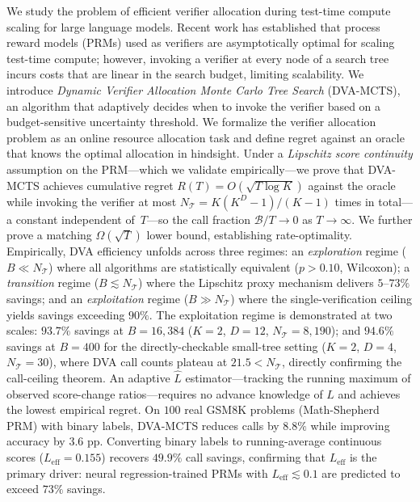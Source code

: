We study the problem of efficient verifier allocation during test-time compute scaling
for large language models. Recent work has established that process reward models (PRMs)
used as verifiers are asymptotically optimal for scaling test-time compute; however,
invoking a verifier at every node of a search tree incurs costs that are linear in the
search budget, limiting scalability. We introduce \emph{Dynamic Verifier Allocation
Monte Carlo Tree Search} (DVA-MCTS), an algorithm that adaptively decides when to
invoke the verifier based on a budget-sensitive uncertainty threshold. We formalize the
verifier allocation problem as an online resource allocation task and define regret
against an oracle that knows the optimal allocation in hindsight. Under a
\emph{Lipschitz score continuity} assumption on the PRM---which we validate
empirically---we prove that DVA-MCTS achieves cumulative regret
$R(T) = O\!\left(\sqrt{T \log K}\right)$ against the oracle while invoking the verifier
at most $N_{\mathcal{T}} = K(K^D-1)/(K-1)$ times in total---a constant independent of~$T$---so
the call fraction $\mathcal{B}/T \to 0$ as $T \to \infty$.
We further prove a matching $\Omega(\sqrt{T})$ lower bound, establishing rate-optimality.
Empirically, DVA efficiency unfolds across three regimes: an \emph{exploration}
regime ($B \ll N_{\mathcal{T}}$) where all algorithms are statistically equivalent
($p{>}0.10$, Wilcoxon); a \emph{transition} regime ($B \lesssim N_{\mathcal{T}}$)
where the Lipschitz proxy mechanism delivers $5$--$73\%$ savings; and an
\emph{exploitation} regime ($B \gg N_{\mathcal{T}}$) where the single-verification
ceiling yields savings exceeding $90\%$.
The exploitation regime is demonstrated at two scales:
$\mathbf{93.7\%}$ savings at $B{=}16{,}384$ ($K{=}2$, $D{=}12$, $N_{\mathcal{T}}{=}8{,}190$);
and $\mathbf{94.6\%}$ savings at $B{=}400$ for the directly-checkable small-tree
setting ($K{=}2$, $D{=}4$, $N_{\mathcal{T}}{=}30$), where DVA call counts plateau at
$21.5 < N_{\mathcal{T}}$, directly confirming the call-ceiling theorem.
An adaptive $\hat{L}$ estimator---tracking the running maximum of observed
score-change ratios---requires no advance knowledge of $L$ and achieves the lowest
empirical regret.
On $100$ real GSM8K problems (Math-Shepherd PRM) with binary labels, DVA-MCTS
reduces calls by $8.8\%$ while improving accuracy by $3.6$ pp.
Converting binary labels to running-average continuous scores
($L_{\text{eff}}{=}0.155$) recovers $\mathbf{49.9\%}$ call savings, confirming
that $L_{\text{eff}}$ is the primary driver: neural regression-trained PRMs with
$L_{\text{eff}} \lesssim 0.1$ are predicted to exceed $73\%$ savings.
